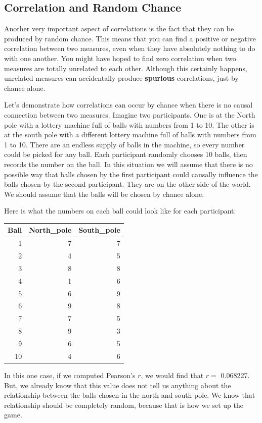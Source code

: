 \documentclass[
]{book}
\begin{document}
\subsection{Correlation and Random Chance}\label{correlation-and-random-chance}

Another very important aspect of correlations is the fact that they can be produced by random chance. This means that you can find a positive or negative correlation between two measures, even when they have absolutely nothing to do with one another. You might have hoped to find zero correlation when two measures are totally unrelated to each other. Although this certainly happens, unrelated measures can accidentally produce \textbf{spurious} correlations, just by chance alone.

Let's demonstrate how correlations can occur by chance when there is no causal connection between two measures. Imagine two participants. One is at the North pole with a lottery machine full of balls with numbers from 1 to 10. The other is at the south pole with a different lottery machine full of balls with numbers from 1 to 10. There are an endless supply of balls in the machine, so every number could be picked for any ball. Each participant randomly chooses 10 balls, then records the number on the ball. In this situation we will assume that there is no possible way that balls chosen by the first participant could causally influence the balls chosen by the second participant. They are on the other side of the world. We should assume that the balls will be chosen by chance alone.

Here is what the numbers on each ball could look like for each participant:

\begin{tabular}{r|r|r}
\hline
Ball & North\_pole & South\_pole\\
\hline
1 & 7 & 7\\
\hline
2 & 4 & 5\\
\hline
3 & 8 & 8\\
\hline
4 & 1 & 6\\
\hline
5 & 6 & 9\\
\hline
6 & 9 & 8\\
\hline
7 & 7 & 5\\
\hline
8 & 9 & 3\\
\hline
9 & 6 & 5\\
\hline
10 & 4 & 6\\
\hline
\end{tabular}

In this one case, if we computed Pearson's \(r\), we would find that \(r =\) 0.068227. But, we already know that this value does not tell us anything about the relationship between the balls chosen in the north and south pole. We know that relationship should be completely random, because that is how we set up the game.
\end{document}
